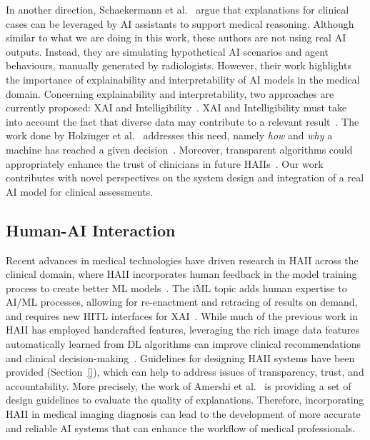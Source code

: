 In another direction, Schaekermann et al.~\cite{10.1145/3313831.3376506} argue that explanations for clinical cases can be leveraged by \ac{AI} assistants to support medical reasoning.
Although similar to what we are doing in this work, these authors are not using real \ac{AI} outputs.
Instead, they are simulating hypothetical \ac{AI} scenarios and agent behaviours, manually generated by radiologists.
However, their work highlights the importance of explainability and interpretability of \ac{AI} models in the medical domain.
Concerning explainability and interpretability, two approaches are currently proposed: \ac{XAI} and Intelligibility~\cite{gunning2017explainable, miller2018explanation}.
\ac{XAI} and Intelligibility must take into account the fact that diverse data may contribute to a relevant result~\cite{10.1145/3411764.3445736, Bharadhwaj:2019:ERS:3308557.3308699}.
The work done by Holzinger et al.~\cite{holzinger2018current} addresses this need, namely {\it how} and {\it why} a machine has reached a given decision~\cite{shah2019artificial}.
Moreover, transparent algorithms could appropriately enhance the trust of clinicians in future \acp{HAII}~\cite{Dominguez:2019:EEA:3301275.3302274, Weisz:2019:BTS:3301275.3302290}.
Our work contributes with novel perspectives on the system design and integration of a real \ac{AI} model for clinical assessments.

\subsection{Human-AI Interaction}
\label{sec:chap005002002}

Recent advances in medical technologies have driven research in \ac{HAII} across the clinical domain, where \ac{HAII} incorporates human feedback in the model training process to create better \ac{ML} models~\cite{10.1145/3411764.3445717, 10.1145/3411764.3445562}.
The \ac{iML} topic adds human expertise to \ac{AI}/\ac{ML} processes, allowing for re-enactment and retracing of results on demand, and requires new \ac{HITL} interfaces for \ac{XAI}~\cite{fails2003interactive, holzinger2016interactive}.
While much of the previous work in \ac{HAII} has employed handcrafted features, leveraging the rich image data features automatically learned from \ac{DL} algorithms can improve clinical recommendations and clinical decision-making~\cite{holzinger2019interactive}.
Guidelines for designing \ac{HAII} systems have been provided (Section~\ref{}), which can help to address issues of transparency, trust, and accountability.
More precisely, the work of Amershi et al.~\cite{10.1145/3290605.3300233} is providing a set of design guidelines to evaluate the quality of explanations.
Therefore, incorporating \ac{HAII} in medical imaging diagnosis can lead to the development of more accurate and reliable \ac{AI} systems that can enhance the workflow of medical professionals.

